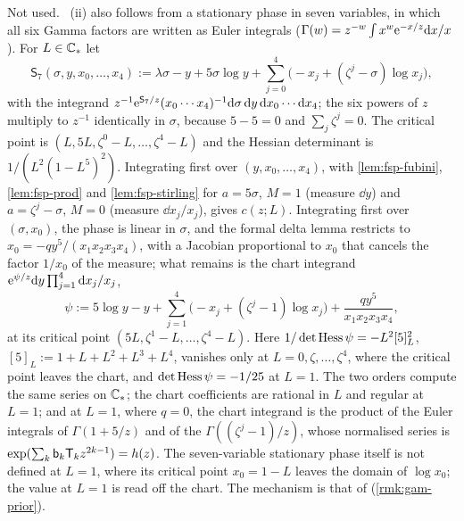 \begin{rmk}
\label{rmk:gam-sevenvar}
Not used. ~(ii) also follows from a stationary phase in seven variables, in which all six Gamma factors are written as Euler integrals ($\Gamma(w)=z^{-w}\int x^w\mathrm{e}^{-x/z}\mathrm{d} x/x$). For $L\in\mathbb{C}_{\ast}$ let
\[
\mathsf S_7(\sigma,y,x_0,\dots,x_4):=\lambda\sigma-y+5\sigma\log y+\sum_{j=0}^4\bigl(-x_j+(\zeta^j-\sigma)\log x_j\bigr),
\]
with the integrand $z^{-1}\mathrm{e}^{\mathsf S_7/z}(x_0\cdots x_4)^{-1}\mathrm{d}\sigma\,\mathrm{d} y\,\mathrm{d} x_0\cdots\mathrm{d} x_4$; the six powers of $z$ multiply to $z^{-1}$ identically in $\sigma$, because $5-5=0$ and $\sum_j\zeta^j=0$. The critical point is $(L,5L,\zeta^0-L,\dots,\zeta^4-L)$ and the Hessian determinant is $1/(L^2(1-L^5)^2)$. Integrating first over $(y,x_0,\dots,x_4)$, with \cref{lem:fsp-fubini}, \cref{lem:fsp-prod} and \cref{lem:fsp-stirling} for $a=5\sigma$, $M=1$ (measure $\dd y$) and $a=\zeta^j-\sigma$, $M=0$ (measure $\dd x_j/x_j$), gives $c(z;L)$. Integrating first over $(\sigma,x_0)$, the phase is linear in $\sigma$, and the formal delta lemma restricts to $x_0=-qy^5/(x_1x_2x_3x_4)$, with a Jacobian proportional to $x_0$ that cancels the factor $1/x_0$ of the measure; what remains is the chart integrand $\mathrm{e}^{\psi/z}\mathrm{d} y\prod_{j=1}^4\mathrm{d} x_j/x_j$,
\[
\psi:=5\log y-y+\sum_{j=1}^4\bigl(-x_j+(\zeta^j-1)\log x_j\bigr)+\frac{qy^5}{x_1x_2x_3x_4},
\]
at its critical point $(5L,\zeta^1-L,\dots,\zeta^4-L)$. Here $1/\det\operatorname{Hess}\psi=-L^2[5]_L^2$, $[5]_L:=1+L+L^2+L^3+L^4$, vanishes only at $L=0,\zeta,\dots,\zeta^4$, where the critical point leaves the chart, and $\det\operatorname{Hess}\psi=-1/25$ at $L=1$. The two orders compute the same series on $\mathbb{C}_{\ast}$; the chart coefficients are rational in $L$ and regular at $L=1$; and at $L=1$, where $q=0$, the chart integrand is the product of the Euler integrals of $\Gamma(1+5/z)$ and of the $\Gamma((\zeta^j-1)/z)$, whose normalised series is $\exp(\sum_k\mathsf{b}_k\mathsf T_kz^{2k-1})=h(z)$. The seven-variable stationary phase itself is not defined at $L=1$, where its critical point $x_0=1-L$ leaves the domain of $\log x_0$; the value at $L=1$ is read off the chart. The mechanism is that of \cite[\S10]{MR1901075} (\cref{rmk:gam-prior}). 
\end{rmk}

